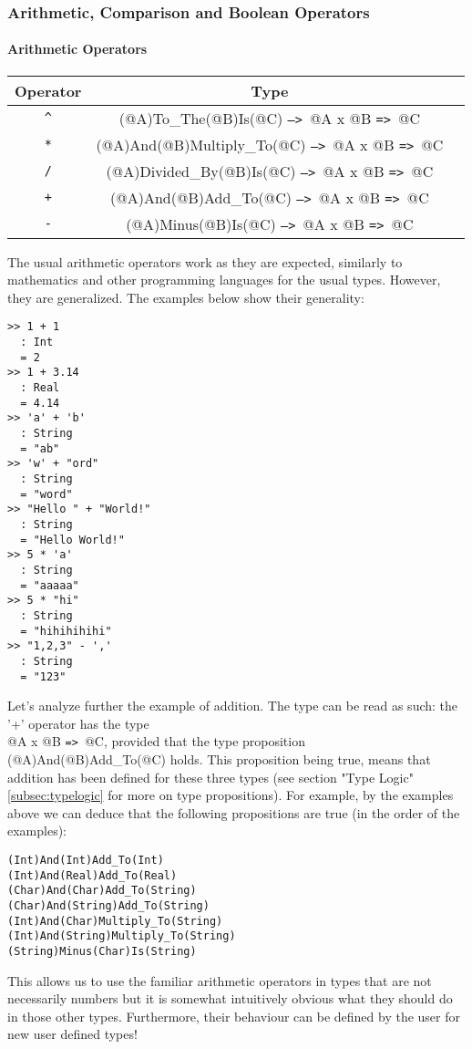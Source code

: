 \documentclass{article}
\def\ra{\texttt{=>}\ }
\def\Ra{\texttt{-->}\ }
\begin{document}
\subsubsection{Arithmetic, Comparison and Boolean Operators}

\paragraph{Arithmetic Operators}
\begin{center}
\begin{tabular}{ |c|c|c| } 
\hline
Operator & Type \\ 
\hline
\hline
\texttt{\^} & (@A)To_The(@B)Is(@C) \Ra @A x @B \ra @C \\
\hline
\texttt{*} & (@A)And(@B)Multiply_To(@C) \Ra @A x @B \ra @C \\
\hline
\texttt{/} & (@A)Divided_By(@B)Is(@C) \Ra @A x @B \ra @C \\
\hline
\texttt{+} & (@A)And(@B)Add_To(@C) \Ra @A x @B \ra @C \\ 
\hline
\texttt{-} & (@A)Minus(@B)Is(@C) \Ra @A x @B \ra @C \\
\hline
\end{tabular}
\end{center}
The usual arithmetic operators work as they are expected, similarly to
mathematics and other programming languages for the usual types. However, they
are generalized. The examples below show their generality:
\begin{verbatim}
>> 1 + 1
  : Int
  = 2
>> 1 + 3.14
  : Real
  = 4.14
>> 'a' + 'b'
  : String
  = "ab"
>> 'w' + "ord"
  : String
  = "word"
>> "Hello " + "World!"
  : String
  = "Hello World!"
>> 5 * 'a'
  : String
  = "aaaaa"
>> 5 * "hi"
  : String
  = "hihihihihi"
>> "1,2,3" - ','
  : String
  = "123"
\end{verbatim}
Let's analyze further the example of addition. The type can be read as such:
the '+' operator has the type \\ @A x @B \ra @C, provided that the type
proposition (@A)And(@B)Add_To(@C) holds. This proposition being true, means that
addition has been defined for these three types (see section "Type Logic"
\ref{subsec:typelogic} for more on type propositions). For example, by the examples
above we can deduce that the following propositions are true (in the order of the 
examples):
\begin{verbatim}
(Int)And(Int)Add_To(Int)
(Int)And(Real)Add_To(Real)
(Char)And(Char)Add_To(String)
(Char)And(String)Add_To(String)
(Int)And(Char)Multiply_To(String)
(Int)And(String)Multiply_To(String)
(String)Minus(Char)Is(String)
\end{verbatim}
This allows us to use the familiar arithmetic operators in types that are not
necessarily numbers but it is somewhat intuitively obvious what they should do
in those other types. Furthermore, their behaviour can be defined by the user
for new user defined types!
\end{document}
